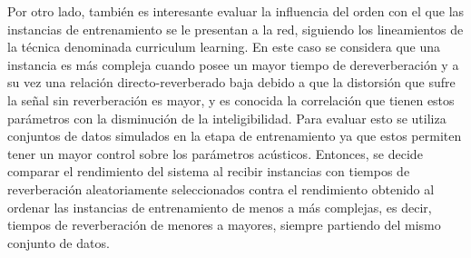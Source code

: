 Por otro lado, también es interesante evaluar la influencia del orden con el que las instancias de entrenamiento se le presentan a la red, siguiendo los lineamientos de la técnica denominada curriculum learning. En este caso se considera que una instancia es más compleja cuando posee un mayor tiempo de dereverberación y a su vez una relación directo-reverberado baja debido a que la distorsión que sufre la señal sin reverberación es mayor, y es conocida la correlación que tienen estos parámetros con la disminución de la inteligibilidad. Para evaluar esto se utiliza conjuntos de datos simulados en la etapa de entrenamiento ya que estos permiten tener un mayor control sobre los parámetros acústicos. Entonces, se decide comparar el rendimiento del sistema al recibir instancias con tiempos de reverberación aleatoriamente seleccionados contra el rendimiento obtenido al ordenar las instancias de entrenamiento de menos a más complejas, es decir, tiempos de reverberación de menores a mayores, siempre partiendo del mismo conjunto de datos. 













